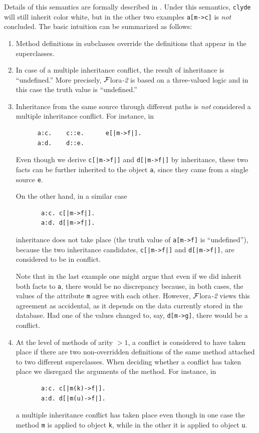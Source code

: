 \documentclass[11pt]{article}
\newcommand{\FLSYSTEM}{{\mbox{\sc ${\cal F}${lora}\rm\emph{-2}}}\xspace}
\begin{document}
Details of this semantics are formally described in
\cite{inheritance-odbase-02}.  Under this semantics, {\tt clyde} will still
inherit color white, but in the other two examples {\tt a[m->c]} is
\emph{not} concluded.  The basic intuition can be summarized as follows:
\begin{enumerate}
\item  Method definitions in subclasses override the definitions that
  appear in the superclasses.
\item In case of a multiple inheritance conflict, the result of inheritance
  is ``undefined.'' More precisely, \FLSYSTEM is based on a three-valued logic and
  in this case the truth value is ``undefined.''
\item  Inheritance from the same source through different paths is
  \emph{not} considered a multiple inheritance conflict. For instance, in
  \begin{verbatim}
      a:c.    c::e.      e[|m->f|].    
      a:d.    d::e.
  \end{verbatim}
  Even though we derive {\tt c[|m->f|]} and {\tt d[|m->f|]} by inheritance,
  these two facts can be further inherited to the object {\tt a}, since
  they came from a single source {\tt e}.

  On the other hand, in a similar case
  \begin{verbatim}
       a:c. c[|m->f|].    
       a:d. d[|m->f|].     
  \end{verbatim}
  inheritance does not take place (the truth value of {\tt a[m->f]} is
  ``undefined''), because the two inheritance candidates, {\tt c[|m->f|]} and
  {\tt d[|m->f|]}, are considered to be in conflict.

  Note that in the last example one might argue that even if we did inherit
  both facts to {\tt a}, there would be no discrepancy because, in both
  cases, the values of the attribute {\tt m} agree with each other.
  However, \FLSYSTEM views this agreement as accidental, as it depends on the
  data currently stored in the database. Had one of the values changed to, say,
  {\tt d[m->g]}, there would be a conflict.
  
\item At the level of methods of arity $>1$, a conflict is considered to have
  taken place if there are two non-overridden definitions of the same method
  attached to two different superclasses. When deciding whether a conflict
  has taken place we disregard the arguments of the method. For instance, in
  \begin{verbatim}
       a:c. c[|m(k)->f|].    
       a:d. d[|m(u)->f|].     
  \end{verbatim}
  a multiple inheritance conflict has taken place even though in one case
  the method {\tt m} is applied to object {\tt k}, while in the other it is
  applied to object {\tt u}. 


\end{enumerate}
\end{document}
